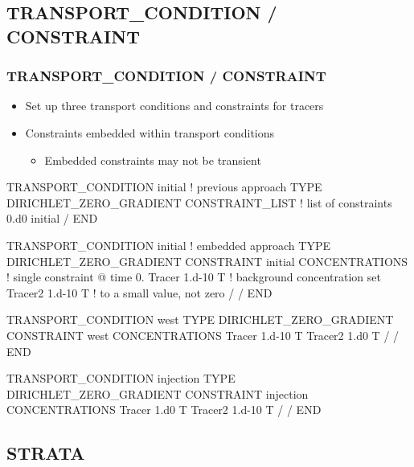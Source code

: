\documentclass{beamer}
\newcommand\bluecomment[1]{{{\color{blue} #1}}}
\newcommand\magentacomment[1]{{{\color{magenta} #1}}}
\begin{document}
\subsection{TRANSPORT\_CONDITION / CONSTRAINT}

\begin{frame}\frametitle{TRANSPORT\_CONDITION / CONSTRAINT}

\begin{itemize}
  \item Set up three transport conditions and constraints for tracers
  \item Constraints embedded within transport conditions
  \begin{itemize}
    \item Embedded constraints may not be transient
  \end{itemize}
\end{itemize}

\newpage
{
\begin{semiverbatim}

TRANSPORT_CONDITION initial      \bluecomment{! previous approach}
  TYPE DIRICHLET_ZERO_GRADIENT
  \magentacomment{CONSTRAINT_LIST       \bluecomment{! list of constraints}
    0.d0 initial  }
  /
END

TRANSPORT_CONDITION initial      \bluecomment{! embedded approach}
  TYPE DIRICHLET_ZERO_GRADIENT
  \magentacomment{CONSTRAINT initial
    CONCENTRATIONS      \bluecomment{! single constraint @ time 0.}
      Tracer  1.d-10 T  \bluecomment{! background concentration set}
      Tracer2 1.d-10 T  \bluecomment{!   to a small value, not zero}
    /}
  /
END
\end{semiverbatim}
}

\newpage
{\small
\begin{semiverbatim}
TRANSPORT_CONDITION west
  TYPE DIRICHLET_ZERO_GRADIENT
  CONSTRAINT west
    CONCENTRATIONS
      Tracer  1.d-10 T
      Tracer2 1.d0   T
    /
  /
END

TRANSPORT_CONDITION injection
  TYPE DIRICHLET_ZERO_GRADIENT
  CONSTRAINT injection
    CONCENTRATIONS
      Tracer  1.d0   T
      Tracer2 1.d-10 T
    /
  /
END
\end{semiverbatim}
}

\end{frame}

\subsection{STRATA}
\end{document}
